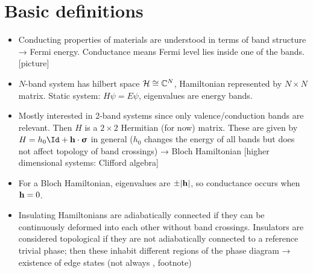 



\section{Basic definitions}
{\color{blue}
\begin{itemize}
	\item Conducting properties of materials are understood in terms of band structure → Fermi energy. Conductance means Fermi level lies inside one of the bands. [picture]
	
	\item $N$-band system has hilbert space $\mathcal{H}\cong\mathbb{C}^N$, Hamiltonian represented by $N\times N$ matrix. Static system: $H\psi = E\psi$, eigenvalues are energy bands.
	
	\item Mostly interested in 2-band systems since only valence/conduction bands are relevant. Then $H$ is a $2\times 2$ Hermitian (for now) matrix. These are given by $H = h_0\Id + \h\cdot\bm{\upsigma}$ in general ($h_0$ changes the energy of all bands but does not affect topology of band crossings) → Bloch Hamiltonian [higher dimensional systems: Clifford algebra]
	
	\item For a Bloch Hamiltonian, eigenvalues are $\pm\abs{\vb{h}}$, so conductance occurs when $\vb{h} = 0$.
	
	\item Insulating Hamiltonians are adiabatically connected if they can be continuously deformed into each other without band crossings. Insulators are considered topological if they are not adiabatically connected to a reference trivial phase; then these inhabit different regions of the phase diagram → existence of edge states (not always \cite{Bernevig_topological-insulators}, footnote)
\end{itemize}
}

